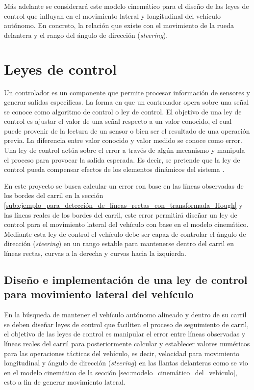Más adelante se considerará este modelo cinemático para el diseño de las leyes de control que influyan en el movimiento lateral y longitudinal del vehículo autónomo. En concreto, la relación que existe con el movimiento de la rueda delantera y el rango del ángulo de dirección (\textit{steering}).

\section{Leyes de control} \label{sec:leyes_de_control}

Un controlador es un componente que permite procesar información de sensores y generar salidas específicas. La forma en que un controlador opera sobre una señal se conoce como algoritmo de control o ley de control.
El objetivo de una ley de control es ajustar el valor de una señal respecto a un valor conocido, el cual puede provenir de la lectura de un sensor o bien ser el resultado de una operación previa. La diferencia entre valor conocido y valor medido se conoce como error. Una ley de control actúa sobre el error a través de algún mecanismo y manipula el proceso para provocar la salida esperada. Es decir, se pretende que la ley de control pueda compensar efectos de los elementos dinámicos del sistema \cite{gonzalez2015review}.

En este proyecto se busca calcular un error con base en las líneas observadas de los bordes del carril en la sección \ref{sub:ejemplo_para_detección_de_líneas_rectas_con_transformada_Hough} y las líneas reales de los bordes del carril, este error permitirá diseñar un ley de control para el movimiento lateral del vehículo con base en el modelo cinemático. Mediante esta ley de control el vehículo debe ser capaz de controlar el ángulo de dirección (\textit{steering})
en un rango estable para mantenerse dentro del carril en líneas rectas, curvas a la derecha y curvas hacia la izquierda.


\subsection{Diseño e implementación de una ley de control para movimiento lateral del vehículo} \label{sub:diseño_e_implementación_de_una_ley_de_control_para_movimiento_lateral_del_vehículo}

En la búsqueda de mantener el vehículo autónomo alineado y dentro de su carril se deben diseñar leyes de control que faciliten el proceso de seguimiento de carril, el objetivo de las leyes de control es manipular el error entre líneas observadas y líneas reales del carril para posteriormente calcular y establecer valores numéricos para las operaciones tácticas del vehículo, es decir, velocidad para movimiento longitudinal y ángulo de dirección (\textit{steering}) en las llantas delanteras como se vio en el modelo cinemático de la sección \ref{sec:modelo_cinemático_del_vehículo}, esto a fin de generar movimiento lateral.

